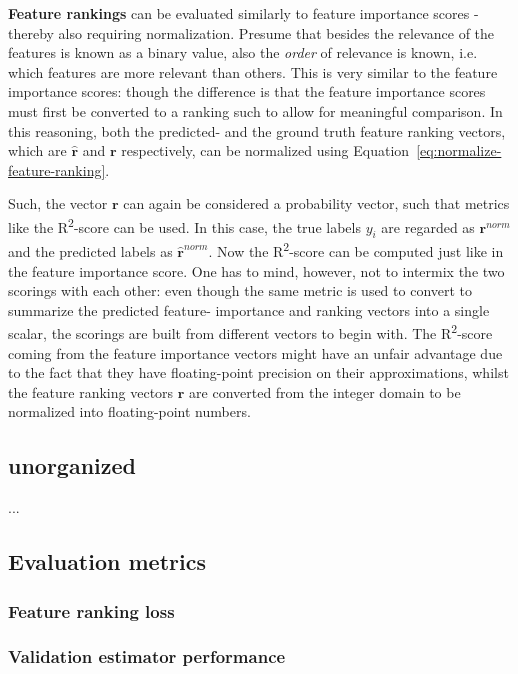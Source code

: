 \documentclass{article}
\begin{document}
\textbf{Feature rankings} can be evaluated similarly to feature importance scores - thereby also requiring normalization. Presume that besides the relevance of the features is known as a binary value, also the \textit{order} of relevance is known, i.e. which features are more relevant than others. This is very similar to the feature importance scores: though the difference is that the feature importance scores must first be converted to a ranking such to allow for meaningful comparison. In this reasoning, both the predicted- and the ground truth feature ranking vectors, which are $\hat{\boldsymbol{r}}$ and $\boldsymbol{r}$ respectively, can be normalized using Equation~\ref{eq:normalize-feature-ranking}.

Such, the vector $\boldsymbol{r}$ can again be considered a probability vector, such that metrics like the R\textsuperscript{2}-score can be used. In this case, the true labels $y_i$ are regarded as $\boldsymbol{r}^{norm}$ and the predicted labels as $\hat{\boldsymbol{r}}^{norm}$. Now the R\textsuperscript{2}-score can be computed just like in the feature importance score. One has to mind, however, not to intermix the two scorings with each other: even though the same metric is used to convert to summarize the predicted feature- importance and ranking vectors into a single scalar, the scorings are built from different vectors to begin with. The R\textsuperscript{2}-score coming from the feature importance vectors might have an unfair advantage due to the fact that they have floating-point precision on their approximations, whilst the feature ranking vectors $\boldsymbol{r}$ are converted from the integer domain to be normalized into floating-point numbers.

\subsection{unorganized}


...

\subsection{Evaluation metrics}
\subsubsection{Feature ranking loss}
\subsubsection{Validation estimator performance}
\end{document}
